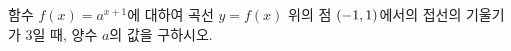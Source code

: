 함수 $f(x)=a^{x+1}$에 대하여 곡선 $y=f(x)$ 위의 점 $(-1{,}\mkern3mu\mathopen{}1)$에서의 접선의 기울기가 $3$일 때, 양수 $a$의 값을 구하시오.
